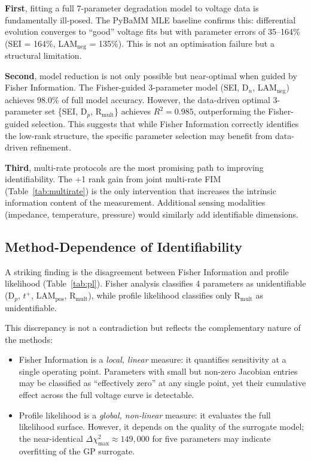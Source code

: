 \documentclass[preprint,12pt]{elsarticle}
\begin{document}
\textbf{First}, fitting a full 7-parameter degradation model to voltage data is fundamentally ill-posed.
The PyBaMM MLE baseline confirms this: differential evolution converges to ``good'' voltage fits but with parameter errors of 35--164\% (SEI = 164\%, LAM$_{\mathrm{neg}}$ = 135\%).
This is not an optimisation failure but a structural limitation.

\textbf{Second}, model reduction is not only possible but near-optimal when guided by Fisher Information.
The Fisher-guided 3-parameter model (SEI, D$_n$, LAM$_{\mathrm{neg}}$) achieves 98.0\% of full model accuracy.
However, the data-driven optimal 3-parameter set \{SEI, D$_p$, R$_{\mathrm{mult}}$\} achieves $R^2 = 0.985$, outperforming the Fisher-guided selection.
This suggests that while Fisher Information correctly identifies the low-rank structure, the specific parameter selection may benefit from data-driven refinement.

\textbf{Third}, multi-rate protocols are the most promising path to improving identifiability.
The +1 rank gain from joint multi-rate FIM (Table~\ref{tab:multirate}) is the only intervention that increases the intrinsic information content of the measurement.
Additional sensing modalities (impedance, temperature, pressure) would similarly add identifiable dimensions.

\subsection{Method-Dependence of Identifiability}

A striking finding is the disagreement between Fisher Information and profile likelihood (Table~\ref{tab:pl}).
Fisher analysis classifies 4 parameters as unidentifiable (D$_p$, $t^+$, LAM$_{\mathrm{pos}}$, R$_{\mathrm{mult}}$), while profile likelihood classifies only R$_{\mathrm{mult}}$ as unidentifiable.

This discrepancy is not a contradiction but reflects the complementary nature of the methods:
\begin{itemize}
\item Fisher Information is a \emph{local, linear} measure: it quantifies sensitivity at a single operating point.
Parameters with small but non-zero Jacobian entries may be classified as ``effectively zero'' at any single point, yet their cumulative effect across the full voltage curve is detectable.
\item Profile likelihood is a \emph{global, non-linear} measure: it evaluates the full likelihood surface.
However, it depends on the quality of the surrogate model; the near-identical $\Delta\chi^2_{\max} \approx 149{,}000$ for five parameters may indicate overfitting of the GP surrogate.
\end{itemize}
\end{document}
